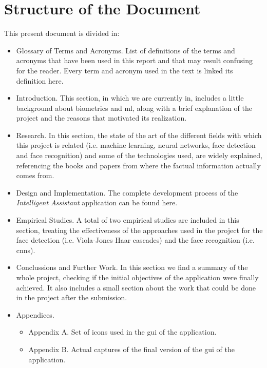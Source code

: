 \section{Structure of the Document}
This present document is divided in:

\begin{itemize}
	\item Glossary of Terms and Acronyms. List of definitions of the terms and acronyms that have been used in this report and that may result confusing for the reader. Every term and acronym used in the text is linked its definition here.
	\item Introduction. This section, in which we are currently in, includes a little background about biometrics and \gls{ml}, along with a brief explanation of the project and the reasons that motivated its realization.  
	\item Research. In this section, the state of the art of the different fields with which this project is related (i.e. machine learning, neural networks, face detection and face recognition) and some of the technologies used, are widely explained, referencing the books and papers from where the factual information actually comes from. 
	\item Design and Implementation. The complete development process of the \textit{Intelligent Assistant} application can be found here.
	\item Empirical Studies. A total of two empirical studies are included in this section, treating the effectiveness of the approaches used in the project for the face detection (i.e. Viola-Jones Haar cascades) and the face recognition (i.e. \glspl{cnn}).
	\item Conclussions and Further Work. In this section we find a summary of the whole project, checking if the initial objectives of the application were finally achieved. It also includes a small section about the work that could be done in the project after the submission.	
	\item Appendices. 
	\begin{itemize}
		\item Appendix A. Set of icons used in the \gls{gui} of the application.
		\item Appendix B. Actual captures of the final version of the \gls{gui} of the application.
	\end{itemize}
\end{itemize}



